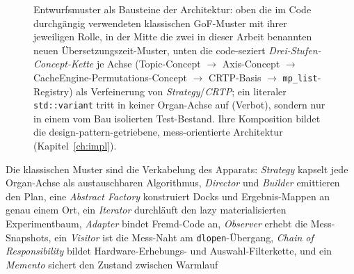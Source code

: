 \begin{nurkurz}
\begin{figure}[htbp]
\caption{Entwurfsmuster als Bausteine der Architektur: oben die im Code durchgängig verwendeten klassischen GoF-Muster mit ihrer jeweiligen Rolle, in der Mitte die zwei in dieser Arbeit benannten neuen Übersetzungszeit-Muster, unten die code-seziert \emph{Drei-Stufen-Concept-Kette} je Achse (Topic-Concept $\to$ Axis-Concept $\to$ CacheEngine-Permutations-Concept $\to$ CRTP-Basis $\to$ \texttt{mp\_list}-Registry) als Verfeinerung von \emph{Strategy}/\emph{CRTP}; ein literaler \texttt{std::variant} tritt in keiner Organ-Achse auf (Verbot), sondern nur in einem vom Bau isolierten Test-Bestand. Ihre Komposition bildet die design-pattern-getriebene, mess-orientierte Architektur (Kapitel~\ref{ch:impl}).}\label{fig:patterns}
\end{figure}
Die klassischen Muster sind die Verkabelung des Apparats: \emph{Strategy} kapselt jede Organ-Achse als
austauschbaren Algorithmus, \emph{Director} und \emph{Builder} emittieren den Plan, eine \emph{Abstract Factory}
konstruiert Docks und Ergebnis-Mappen an genau einem Ort, ein \emph{Iterator} durchläuft den lazy
materialisierten Experimentbaum, \emph{Adapter} bindet Fremd-Code an, \emph{Observer} erhebt die
Mess-Snapshots, ein \emph{Visitor} ist die Mess-Naht am \texttt{dlopen}-Übergang, \emph{Chain of Responsibility}
bildet Hardware-Erhebungs- und Auswahl-Filterkette, und ein \emph{Memento} sichert den Zustand zwischen Warmlauf

\end{nurkurz}
